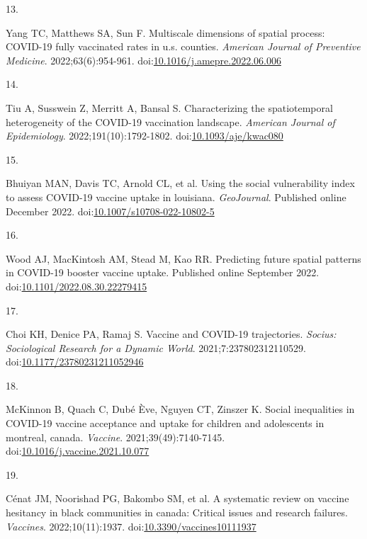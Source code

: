 \documentclass[
  letterpaper,
  DIV=11,
  numbers=noendperiod]{scrartcl}
\newlength{\cslhangindent}
\newlength{\csllabelwidth}
\newlength{\cslentryspacingunit} %
\newenvironment{CSLReferences}[2] %
 {%
  \setlength{\parindent}{0pt}
  \ifodd #1
  \let\oldpar\par
  \def\par{\hangindent=\cslhangindent\oldpar}
  \fi
  \setlength{\parskip}{#2\cslentryspacingunit}
 }%
 {}
\newcommand{\CSLLeftMargin}[1]{\parbox[t]{\csllabelwidth}{#1}}
\newcommand{\CSLRightInline}[1]{\parbox[t]{\linewidth - \csllabelwidth}{#1}\break}
\begin{document}
\begin{CSLReferences}{0}{0}
\leavevmode{}%
\CSLLeftMargin{13. }%
\CSLRightInline{Yang TC, Matthews SA, Sun F. Multiscale dimensions of
spatial process: {COVID}-19 fully vaccinated rates in u.s. counties.
\emph{American Journal of Preventive Medicine}. 2022;63(6):954-961.
doi:\href{https://doi.org/10.1016/j.amepre.2022.06.006}{10.1016/j.amepre.2022.06.006}}

\leavevmode{}%
\CSLLeftMargin{14. }%
\CSLRightInline{Tiu A, Susswein Z, Merritt A, Bansal S. Characterizing
the spatiotemporal heterogeneity of the {COVID}-19 vaccination
landscape. \emph{American Journal of Epidemiology}.
2022;191(10):1792-1802.
doi:\href{https://doi.org/10.1093/aje/kwac080}{10.1093/aje/kwac080}}

\leavevmode{}%
\CSLLeftMargin{15. }%
\CSLRightInline{Bhuiyan MAN, Davis TC, Arnold CL, et al. Using the
social vulnerability index to assess {COVID}-19 vaccine uptake in
louisiana. \emph{{GeoJournal}}. Published online December 2022.
doi:\href{https://doi.org/10.1007/s10708-022-10802-5}{10.1007/s10708-022-10802-5}}

\leavevmode{}%
\CSLLeftMargin{16. }%
\CSLRightInline{Wood AJ, MacKintosh AM, Stead M, Kao RR. Predicting
future spatial patterns in {COVID}-19 booster vaccine uptake. Published
online September 2022.
doi:\href{https://doi.org/10.1101/2022.08.30.22279415}{10.1101/2022.08.30.22279415}}

\leavevmode{}%
\CSLLeftMargin{17. }%
\CSLRightInline{Choi KH, Denice PA, Ramaj S. Vaccine and {COVID}-19
trajectories. \emph{Socius: Sociological Research for a Dynamic World}.
2021;7:237802312110529.
doi:\href{https://doi.org/10.1177/23780231211052946}{10.1177/23780231211052946}}

\leavevmode{}%
\CSLLeftMargin{18. }%
\CSLRightInline{McKinnon B, Quach C, Dubé Ève, Nguyen CT, Zinszer K.
Social inequalities in {COVID}-19 vaccine acceptance and uptake for
children and adolescents in montreal, canada. \emph{Vaccine}.
2021;39(49):7140-7145.
doi:\href{https://doi.org/10.1016/j.vaccine.2021.10.077}{10.1016/j.vaccine.2021.10.077}}

\leavevmode{}%
\CSLLeftMargin{19. }%
\CSLRightInline{Cénat JM, Noorishad PG, Bakombo SM, et al. A systematic
review on vaccine hesitancy in black communities in canada: Critical
issues and research failures. \emph{Vaccines}. 2022;10(11):1937.
doi:\href{https://doi.org/10.3390/vaccines10111937}{10.3390/vaccines10111937}}


\end{CSLReferences}
\end{document}
